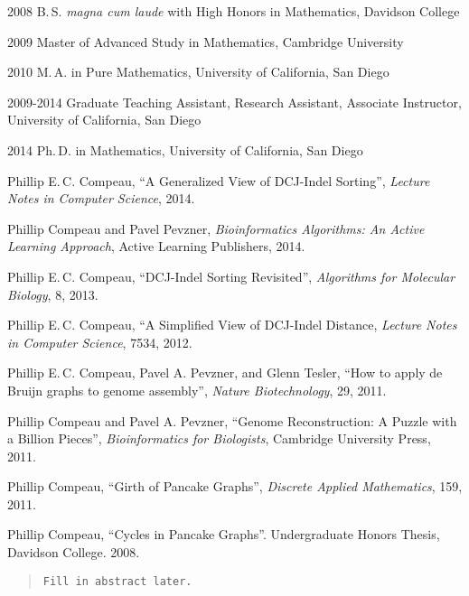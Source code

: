 \begin{frontmatter}
%
%
\begin{vitapage}
\begin{vita}
  \item[2008] B.\,S. \emph{magna cum laude} with High Honors in Mathematics, Davidson College
  \item[2009] Master of Advanced Study in Mathematics, Cambridge University
  \item[2010] M.\,A. in Pure Mathematics, University of California, San Diego
  \item[2009-2014] Graduate Teaching Assistant, Research Assistant, Associate Instructor, University of California, San Diego
  \item[2014] Ph.\,D. in Mathematics, University of California, San Diego
\end{vita}
\begin{publications}
  \item Phillip E.\,C. Compeau, ``A Generalized View of DCJ-Indel Sorting'', \emph{Lecture Notes in Computer Science}, 2014.
  \item Phillip Compeau and Pavel Pevzner, \emph{Bioinformatics Algorithms: An Active Learning Approach}, Active Learning Publishers, 2014.
  \item Phillip E.\,C. Compeau, ``DCJ-Indel Sorting Revisited'', \emph{Algorithms for Molecular Biology}, 8, 2013.
  \item Phillip E.\,C. Compeau, ``A Simplified View of DCJ-Indel Distance, \emph{Lecture Notes in Computer Science}, 7534, 2012.
  \item Phillip E.\,C. Compeau, Pavel A. Pevzner, and Glenn Tesler, ``How to apply de Bruijn graphs to genome assembly'', \emph{Nature Biotechnology}, 29, 2011.
  \item Phillip Compeau and Pavel A. Pevzner, ``Genome Reconstruction: A Puzzle with a Billion Pieces'', \emph{Bioinformatics for Biologists}, Cambridge University Press, 2011.
  \item Phillip Compeau, ``Girth of Pancake Graphs'', \emph{Discrete Applied Mathematics}, 159, 2011.
  \item Phillip Compeau, ``Cycles in Pancake Graphs''.  Undergraduate Honors Thesis, Davidson College. 2008.
\end{publications}
\end{vitapage}


%
%
\begin{abstract}
  \texttt{Fill in abstract later.}
\end{abstract}


\end{frontmatter}
